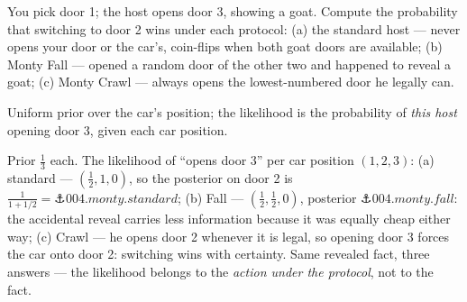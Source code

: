 \begin{problem}[stretch]
You pick door 1; the host opens door 3, showing a goat. Compute the
probability that switching to door 2 wins under each protocol:
(a) the standard host — never opens your door or the car's, coin-flips
when both goat doors are available; (b) Monty Fall — opened a random
door of the other two and happened to reveal a goat; (c) Monty Crawl —
always opens the lowest-numbered door he legally can.
\begin{hint}
Uniform prior over the car's position; the likelihood is the
probability of \emph{this host} opening door 3, given each car
position.
\end{hint}
\begin{solution}
Prior $\tfrac13$ each. The likelihood of ``opens door 3'' per car
position $(1, 2, 3)$: (a) standard — $(\tfrac12, 1, 0)$, so the
posterior on door 2 is
$\tfrac{1}{1 + 1/2} = \anchor{004.monty.standard}$; (b) Fall —
$(\tfrac12, \tfrac12, 0)$, posterior
$\anchor{004.monty.fall}$: the accidental reveal carries less
information because it was equally cheap either way; (c) Crawl — he
opens door 2 whenever it is legal, so opening door 3 forces the car
onto door 2: switching wins with certainty. Same revealed fact, three
answers — the likelihood belongs to the \emph{action under the
protocol}, not to the fact.
\end{solution}
\end{problem}
